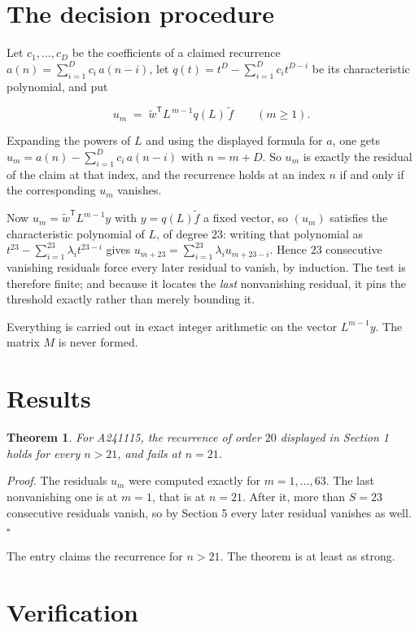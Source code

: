\documentclass[11pt]{article}
\newtheorem{theorem}{Theorem}
\theoremstyle{definition}
\begin{document}
\section{The decision procedure}

Let $c_1,\dots,c_D$ be the coefficients of a claimed recurrence $a(n) = \sum_{i=1}^{D} c_i\,a(n-i)$, let $q(t) = t^{D} - \sum_{i=1}^{D} c_i t^{D-i}$ be its characteristic polynomial, and put

\[u_m \;=\; \tilde w^{\mathsf T} L^{\,m-1} q(L)\,\tilde f \qquad (m \ge 1).\]

Expanding the powers of $L$ and using the displayed formula for $a$, one gets $u_m = a(n) - \sum_{i=1}^{D} c_i\,a(n-i)$ with $n = m + D$. So $u_m$ is exactly the residual of the claim at that index, and the recurrence holds at an index $n$ if and only if the corresponding $u_m$ vanishes.

Now $u_m = \tilde w^{\mathsf T} L^{m-1} y$ with $y = q(L)\tilde f$ a fixed vector, so $(u_m)$ satisfies the characteristic polynomial of $L$, of degree $23$: writing that polynomial as $t^{23} - \sum_{i=1}^{23} \lambda_i t^{23-i}$ gives $u_{m+23} = \sum_{i=1}^{23} \lambda_i u_{m+23-i}$. Hence $23$ consecutive vanishing residuals force every later residual to vanish, by induction. The test is therefore finite; and because it locates the {\itshape last} nonvanishing residual, it pins the threshold exactly rather than merely bounding it.

Everything is carried out in exact integer arithmetic on the vector $L^{m-1}y$. The matrix $M$ is never formed.

\section{Results}

\begin{theorem} For A241115, the recurrence of order $20$ displayed in Section 1 holds for every $n > 21$, and fails at $n = 21$.\end{theorem}

{\itshape Proof.} The residuals $u_m$ were computed exactly for $m = 1,\dots,63$. The last nonvanishing one is at $m = 1$, that is at $n = 21$. After it, more than $S = 23$ consecutive residuals vanish, so by Section 5 every later residual vanishes as well. $\square$

The entry claims the recurrence for $n > 21$. The theorem is at least as strong.

\section{Verification}
\end{document}
